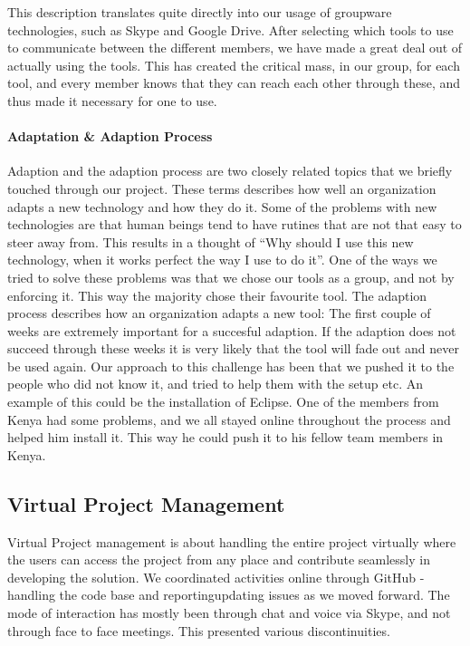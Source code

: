 This description translates quite directly into our usage of groupware technologies, such as Skype and Google Drive. After selecting which tools to use to communicate between the different members, we have made a great deal out of actually using the tools. This has created the critical mass, in our group, for each tool, and every member knows that they can reach each other through these, and thus made it necessary for one to use.

\paragraph{Adaptation \& Adaption Process} \label{par:adaptationandadaptationprocess}
Adaption and the adaption process \cite{tyre1994windows} are two closely related topics that we briefly touched through our project. These terms describes how well an organization adapts a new technology and how they do it. Some of the problems with new technologies are that human beings tend to have rutines that are not that easy to steer away from. This results in a thought of ``Why should I use this new technology, when it works perfect the way I use to do it''. One of the ways we tried to solve these problems was that we chose our tools as a group, and not by enforcing it. This way the majority chose their favourite tool. The adaption process describes how an organization adapts a new tool: The first couple of weeks are extremely important for a succesful adaption. If the adaption does not succeed through these weeks it is very likely that the tool will fade out and never be used again. Our approach to this challenge has been that we pushed it to the people who did not know it, and tried to help them with the setup etc. An example of this could be the installation of Eclipse. One of the members from Kenya had some problems, and we all stayed online throughout the process and helped him install it. This way he could push it to his fellow team members in Kenya.

\subsection{Virtual Project Management} \label{subsec:adaptationandadaptationprocess}
Virtual Project management is about handling the entire project virtually where the users can access the project from any place and contribute seamlessly in developing the solution. We coordinated activities online through GitHub - handling the code base and reporting\/updating issues as we moved forward. The mode of interaction has mostly been through chat and voice via Skype, and not through face to face meetings. This presented various discontinuities.

